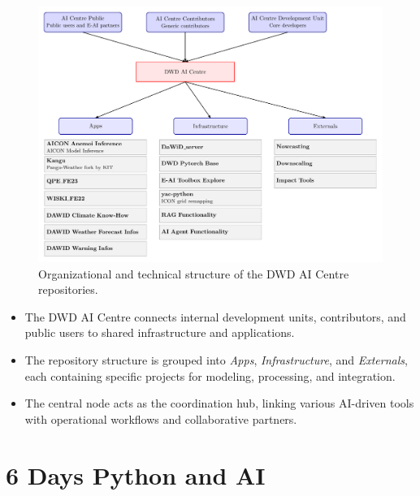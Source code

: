 \begin{figure}[h]
  \centering
  \includegraphics[width=\textwidth]{chapters/ai_centre_graphics.pdf}
  \caption{Organizational and technical structure of the DWD AI Centre repositories.}
  \label{fig:ai_centre_structure}
\end{figure}

\begin{itemize}
  \item The DWD AI Centre connects internal development units, contributors, and public users to shared infrastructure and applications.
  \item The repository structure is grouped into \emph{Apps}, \emph{Infrastructure}, and \emph{Externals}, each containing specific projects for modeling, processing, and integration.
  \item The central node acts as the coordination hub, linking various AI-driven tools with operational workflows and collaborative partners.
\end{itemize}



%
\section{6 Days Python and AI}

